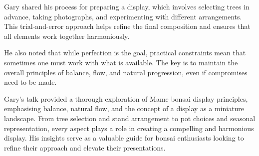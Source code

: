 \medskip

\noindent
Gary shared his process for preparing a display, which involves selecting trees in advance, taking photographs, and experimenting with different arrangements.
This trial\--and\--error approach helps refine the final composition and ensures that all elements work together harmoniously.

He also noted that while perfection is the goal, practical constraints mean that sometimes one must work with what is available.
The key is to maintain the overall principles of balance, flow, and natural progression, even if compromises need to be made.

\medskip

\noindent
Gary's talk provided a thorough exploration of Mame bonsai display principles, emphasising balance, natural flow, and the concept of a display as a miniature landscape.
From tree selection and stand arrangement to pot choices and seasonal representation, every aspect plays a role in creating a compelling and harmonious display.
His insights serve as a valuable guide for bonsai enthusiasts looking to refine their approach and elevate their presentations.

\closearticle
